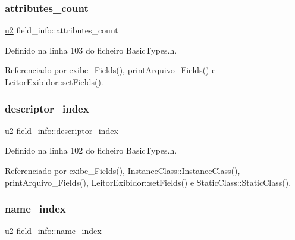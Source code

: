 \mbox{\label{structfield__info_a83bfa4ff84a608e3dbd1c3968ebe1b80}} 
\subsubsection{\texorpdfstring{attributes\+\_\+count}{attributes\_count}}
{\footnotesize\ttfamily \hyperlink{BasicTypes_8h_a732cde1300aafb73b0ea6c2558a7a54f}{u2} field\+\_\+info\+::attributes\+\_\+count}



Definido na linha 103 do ficheiro Basic\+Types.\+h.



Referenciado por exibe\+\_\+\+Fields(), print\+Arquivo\+\_\+\+Fields() e Leitor\+Exibidor\+::set\+Fields().

\mbox{\label{structfield__info_a12dd492b7fb1d61da1ac14938d97b07f}} 
\subsubsection{\texorpdfstring{descriptor\+\_\+index}{descriptor\_index}}
{\footnotesize\ttfamily \hyperlink{BasicTypes_8h_a732cde1300aafb73b0ea6c2558a7a54f}{u2} field\+\_\+info\+::descriptor\+\_\+index}



Definido na linha 102 do ficheiro Basic\+Types.\+h.



Referenciado por exibe\+\_\+\+Fields(), Instance\+Class\+::\+Instance\+Class(), print\+Arquivo\+\_\+\+Fields(), Leitor\+Exibidor\+::set\+Fields() e Static\+Class\+::\+Static\+Class().

\mbox{\label{structfield__info_a425e3ae85badd81c67ef00acca85ad9e}} 
\subsubsection{\texorpdfstring{name\+\_\+index}{name\_index}}
{\footnotesize\ttfamily \hyperlink{BasicTypes_8h_a732cde1300aafb73b0ea6c2558a7a54f}{u2} field\+\_\+info\+::name\+\_\+index}



